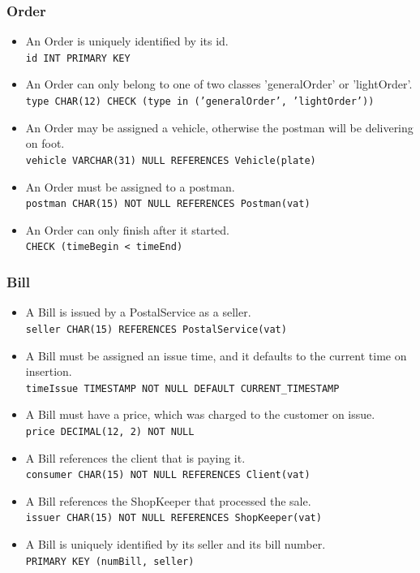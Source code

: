 \documentclass{report}[a4paper]
\theoremstyle{remark}
\begin{document}
\subsubsection{Order}
\begin{itemize}
    \item An Order is uniquely identified by its id.                                                \\ \texttt{id INT PRIMARY KEY}
    \item An Order can only belong to one of two classes 'generalOrder' or 'lightOrder'.            \\ \texttt{type CHAR(12) CHECK (type in ('generalOrder', 'lightOrder'))}
    \item An Order may be assigned a vehicle, otherwise the postman will be delivering on foot.     \\ \texttt{vehicle VARCHAR(31) NULL REFERENCES Vehicle(plate)}
    \item An Order must be assigned to a postman.                                                   \\ \texttt{postman CHAR(15) NOT NULL REFERENCES Postman(vat)}
    \item An Order can only finish after it started.                                                \\ \texttt{CHECK (timeBegin < timeEnd)}
\end{itemize}
\subsubsection{Bill}
\begin{itemize}
    \item A Bill is issued by a PostalService as a seller.                                          \\ \texttt{seller CHAR(15) REFERENCES PostalService(vat)}
    \item A Bill must be assigned an issue time, and it defaults to the current time on insertion.  \\ \texttt{timeIssue TIMESTAMP NOT NULL DEFAULT CURRENT\_TIMESTAMP}
    \item A Bill must have a price, which was charged to the customer on issue.                     \\ \texttt{price DECIMAL(12, 2) NOT NULL}
    \item A Bill references the client that is paying it.                                           \\ \texttt{consumer CHAR(15) NOT NULL REFERENCES Client(vat)}
    \item A Bill references the ShopKeeper that processed the sale.                                 \\ \texttt{issuer CHAR(15) NOT NULL REFERENCES ShopKeeper(vat)}
    \item A Bill is uniquely identified by its seller and its bill number.                          \\ \texttt{PRIMARY KEY (numBill, seller)}
\end{itemize}
\end{document}
